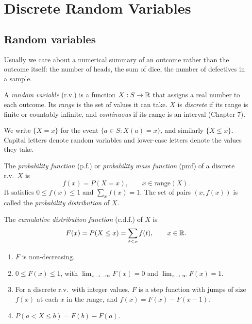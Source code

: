 \chapter{Discrete Random Variables}

\section{Random variables}

Usually we care about a numerical summary of an outcome rather than the outcome itself:
the number of heads, the sum of dice, the number of defectives in a sample.

\begin{definition}
A \emph{random variable} (r.v.) is a function $X : S \to \mathbb{R}$ that assigns a real number to
each outcome. Its \emph{range} is the set of values it can take. $X$ is \emph{discrete} if
its range is finite or countably infinite, and \emph{continuous} if its range is an
interval (Chapter 7).
\end{definition}

We write $\{X = x\}$ for the event $\{a\in S : X(a) = x\}$, and similarly
$\{X \le x\}$. Capital letters denote random variables and lower-case letters denote the
values they take.

\begin{definition}
The \emph{probability function} (p.f.) or \emph{probability mass function} (pmf) of a
discrete r.v.\ $X$ is
\[
  f(x) = P(X = x), \qquad x \in \text{range}(X).
\]
It satisfies $0 \le f(x) \le 1$ and $\sum_{x} f(x) = 1$. The set of pairs $(x, f(x))$ is
called the \emph{probability distribution} of $X$.
\end{definition}

\begin{definition}
The \emph{cumulative distribution function} (c.d.f.) of $X$ is
\[
  F(x) = P(X \le x) = \sum_{t \le x} f(t), \qquad x\in\mathbb{R}.
\]
\end{definition}

\begin{theorem}[Properties of a c.d.f.]
\begin{enumerate}
  \item $F$ is non-decreasing.
  \item $0 \le F(x) \le 1$, with $\lim_{x\to-\infty}F(x) = 0$ and
        $\lim_{x\to\infty} F(x) = 1$.
  \item For a discrete r.v.\ with integer values, $F$ is a step function with jumps of
        size $f(x)$ at each $x$ in the range, and $f(x) = F(x) - F(x-1)$.
  \item $P(a < X \le b) = F(b) - F(a)$.
\end{enumerate}
\end{theorem}

